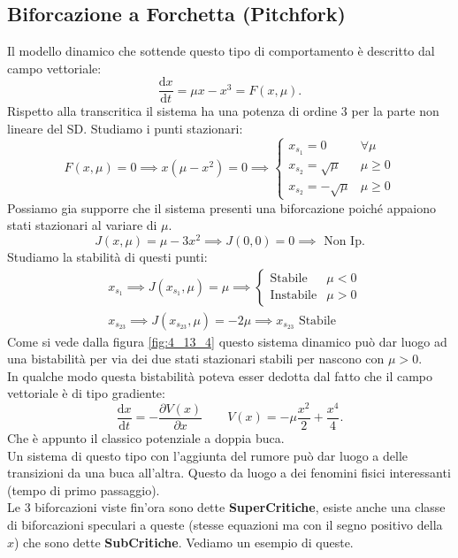 \subsection{Biforcazione a Forchetta (Pitchfork)}%
Il modello dinamico che sottende questo tipo di comportamento è descritto dal campo vettoriale:
\[
    \frac{\text{d} x}{\text{d} t} = \mu x - x^3 = F(x, \mu) 
.\] 
Rispetto alla transcritica il sistema ha una potenza di ordine 3 per la parte non lineare del SD. Studiamo i punti stazionari:
\[
    F(x, \mu) = 0 \implies  x(\mu-x^2) =0
    \implies 
    \begin{cases}
	x_{s_1}=0 & \forall \mu\\
	x_{s_2}=\sqrt{\mu}&  \mu\ge 0\\
	x_{s_2}=-\sqrt{\mu}& \mu\ge 0
    \end{cases}
\] 
Possiamo gia supporre che il sistema presenti una biforcazione poiché appaiono stati stazionari al variare di $\mu$.
\[
    J(x, \mu) = \mu-3x^2 \implies  J(0, 0) = 0 \implies  \text{ Non Ip.}
\] 
Studiamo la stabilità di questi punti:
\[\begin{aligned}
    & x_{s_1}\implies J(x_{s_1}, \mu) = \mu  \implies  \begin{cases}
	\text{Stabile} & \mu <0\\
	\text{Instabile} & \mu > 0
    \end{cases}\\
    & x_{s_{23}}\implies J(x_{s_{23}}, \mu) = -2\mu\implies  x_{s_{23}}\text{ Stabile}
\end{aligned}\]
Come si vede dalla figura \ref{fig:4_13_4} questo sistema dinamico può dar luogo ad una bistabilità per via dei due stati stazionari stabili per nascono con $\mu >0$.\\
In qualche modo questa bistabilità poteva esser dedotta dal fatto che il campo vettoriale è di tipo gradiente:
\[
    \frac{\text{d} x}{\text{d} t} = -\frac{\partial V(x) }{\partial x} \qquad  V(x) = - \mu  \frac{x^2}{2} + \frac{x^4}{4}
.\] Che è appunto il classico potenziale a doppia buca.\\
Un sistema di questo tipo con l'aggiunta del rumore può dar luogo a delle transizioni da una buca all'altra. Questo da luogo a dei fenomini fisici interessanti (tempo di primo passaggio).\\
Le 3 biforcazioni viste fin'ora sono dette \textbf{SuperCritiche}, esiste anche una classe di biforcazioni speculari a queste (stesse equazioni ma con il segno positivo della $x$) che sono dette \textbf{SubCritiche}. Vediamo un esempio di queste.
